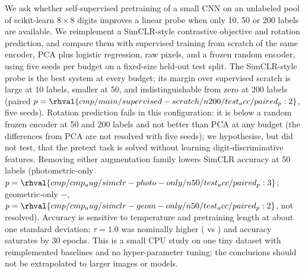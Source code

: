We ask whether self-supervised pretraining of a small CNN on an unlabeled pool of scikit-learn $8\times8$ digits improves a linear probe when only 10, 50 or 200 labels are available. We reimplement a SimCLR-style contrastive objective and rotation prediction, and compare them with supervised training from scratch of the same encoder, PCA plus logistic regression, raw pixels, and a frozen random encoder, using five seeds per budget on a fixed-size held-out test split. The SimCLR-style probe is the best system at every budget; its margin over supervised scratch is large at 10 labels, smaller at 50, and indistinguishable from zero at 200 labels (paired $p=\rhval{cmp/main/supervised-scratch/n200/test_acc/paired_p:2}$, five seeds). Rotation prediction fails in this configuration: it is below a random frozen encoder at 50 and 200 labels and not better than PCA at any budget (the differences from PCA are not resolved with five seeds); we hypothesise, but did not test, that the pretext task is solved without learning digit-discriminative features. Removing either augmentation family lowers SimCLR accuracy at 50 labels (photometric-only $p=\rhval{cmp/cmp_aug/simclr-photo-only/n50/test_acc/paired_p:3}$; geometric-only $-$, $p=\rhval{cmp/cmp_aug/simclr-geom-only/n50/test_acc/paired_p:2}$, not resolved). Accuracy is sensitive to temperature and pretraining length at about one standard deviation; $\tau=1.0$ was nominally higher ( vs ) and accuracy saturates by 30 epochs. This is a small CPU study on one tiny dataset with reimplemented baselines and no hyper-parameter tuning; the conclusions should not be extrapolated to larger images or models.
